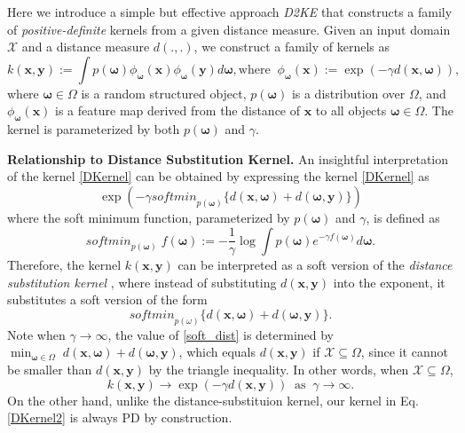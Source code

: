 \documentclass{article}
\newcommand{\X}{\mathcal{X}}
\newcommand{\1}{\mathbf{1}}
\newcommand{\bx}{\boldsymbol{x}}
\newcommand{\by}{\boldsymbol{y}}
\newcommand{\bomega}{\boldsymbol{\omega}}
\newcommand{\softmin}{\mathit{softmin}}
\begin{document}
Here we introduce a simple but effective approach \emph{D2KE} that constructs a family of \emph{positive-definite} kernels from a given distance measure. Given an input domain $\X$ and a distance measure $d(.,.)$, we construct a family of kernels as
\begin{equation}\label{DKernel}
k(\bx,\by):=\int p(\bomega) \phi_{\bomega}(\bx)\phi_{\bomega}(\by) d\bomega, \text{where}\;\; \phi_{\bomega}(\bx):=\exp(-\gamma d(\bx,\bomega)),
\end{equation}
where $\bomega\in \Omega$ is a random structured object, $p(\bomega)$ is a distribution over $\Omega$, and $\phi_{\bomega}(\bx)$ is a feature map derived from the distance of $\bx$ to all objects $\bomega\in\Omega$. The kernel is parameterized by both $p(\bomega)$ and $\gamma$. 

\textbf{Relationship to Distance Substitution Kernel.} 
An insightful interpretation of the kernel \eqref{DKernel} can be obtained by expressing the kernel \eqref{DKernel} as
\begin{equation}\label{DKernel2}
\exp\left( -\gamma\softmin_{p(\bomega)}\{ d(\bx,\bomega)+d(\bomega,\by) \} \right)
\end{equation}
where the soft minimum function, parameterized by $p(\bomega)$ and $\gamma$, is defined as
\begin{equation}\label{softmin}
\softmin_{p(\bomega)}\;f(\bomega):= -\frac{1}{\gamma}\log \int p(\bomega) e^{-\gamma f(\bomega)} d\bomega.
\end{equation} 
Therefore, the kernel $k(\bx,\by)$ can be interpreted as a soft version of the \emph{distance substitution kernel} \cite{haasdonk2004learning}, where instead of substituting $d(\bx,\by)$ into the exponent, it substitutes a soft version of the form
\begin{equation}\label{soft_dist}
\softmin_{p(\omega)}\{ d(\bx,\bomega)+d(\bomega,\by) \}.
\end{equation}
Note when $\gamma\rightarrow\infty$, the value of \eqref{soft_dist} is determined by $\min_{\bomega\in\Omega}\;  d(\bx,\bomega)+d(\bomega,\by) $, which equals $d(\bx,\by)$ if $\X\subseteq\Omega$, since it cannot be smaller than $d(\bx,\by)$ by the triangle inequality. In other words, when $\X\subseteq \Omega$,
$$
k(\bx,\by) \rightarrow \exp(-\gamma d(\bx,\by)) \;\;\text{as}\;\; \gamma\rightarrow \infty.
$$
On the other hand, unlike the distance-substituion kernel, our kernel in Eq. \eqref{DKernel2} is always PD by construction. 
\end{document}
